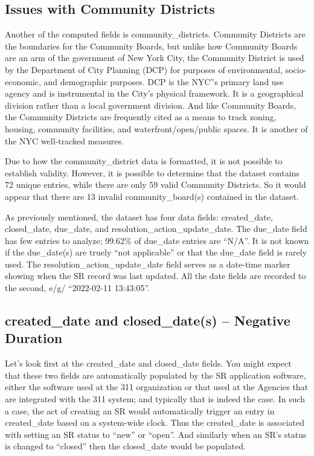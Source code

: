 \documentclass[12pt, titlepage]{article}
\begin{document}
{	\subsection{Issues with Community Districts}
	Another of the computed fields is community\_districts. Community Districts are the boundaries for the Community Boards, but unlike how Community Boards are
	an arm of the government of New York City, the Community District is used by the Department of City Planning (DCP) for purposes of environmental, socio-economic, and
	demographic purposes. DCP is the NYC''s primary land use agency and is instrumental in the City's physical framework.  It is a geographical division rather
	than a local government division. And like Community Boards, the Community Districts are frequently cited as a means to track zoning, housing, community facilities,
	and waterfront/open/public spaces. It is another of the NYC well-tracked measures.

	Due to how the community\_district data is formatted, it is not possible to establish validity. However, it is possible to determine that the dataset contains
	72 unique entries, while there are only 59 valid Community Districts. So it would appear that there are 13 invalid community\_board(s) contained in the dataset.
	
As previously mentioned, the dataset has four data fields:  created\_date, closed\_date, due\_date, and resolution\_action\_update\_date.
The due\_date field has few entries to analyze; 99.62\% of due\_date entries are ``N/A''.  It is not known if the due\_date(s) are truely
``not applicable'' or that the due\_date field is rarely used. The  resolution\_action\_update\_date field serves as a date-time marker
showing when the SR record was last updated.  All the date fields are recorded to the second, e/g/ ``2022-02-11 13:43:05''.

\subsection{created\_date and closed\_date(s) -- Negative Duration}
Let's look first at the created\_date and closed\_date fields. You might expect that these two fields are automatically populated by the 
SR application software, either the software used at the 311 organization or that used at the Agencies that are integrated with the 311 system;
and typically that is indeed the case. In such a case, the act of creating an SR would automatically trigger an entry in created\_date based on a system-wide clock. Thus
the created\_date is associated with setting an SR status to ``new'' or ``open''. And similarly when an SR's status is changed to
``closed'' then the closed\_date would be populated. 

}
\end{document}
